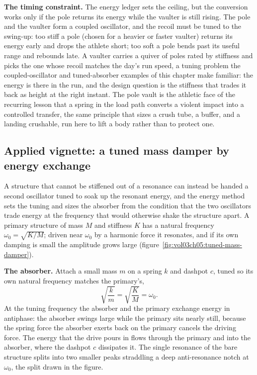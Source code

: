 \textbf{The timing constraint.} The energy ledger sets the ceiling, but the
conversion works only if the pole returns its energy while the vaulter is
still rising. The pole and the vaulter form a coupled oscillator, and the
recoil must be tuned to the swing-up: too stiff a pole (chosen for a heavier
or faster vaulter) returns its energy early and drops the athlete short; too
soft a pole bends past its useful range and rebounds late. A vaulter carries
a quiver of poles rated by stiffness and picks the one whose recoil matches
the day's run speed, a tuning problem the coupled-oscillator and
tuned-absorber examples of this chapter make familiar: the energy is there in
the run, and the design question is the stiffness that trades it back as
height at the right instant. The pole vault is the athletic face of the
recurring lesson that a spring in the load path converts a violent impact
into a controlled transfer, the same principle that sizes a crush tube, a
buffer, and a landing crushable, run here to lift a body rather than to
protect one.

\subsection{Applied vignette: a tuned mass damper by energy exchange}

A structure that cannot be stiffened out of a resonance can instead be handed
a second oscillator tuned to soak up the resonant energy, and the energy
method sets the tuning and sizes the absorber from the condition that the two
oscillators trade energy at the frequency that would otherwise shake the
structure apart. A primary structure of mass $M$ and stiffness $K$ has a
natural frequency $\omega_0 = \sqrt{K/M}$; driven near $\omega_0$ by a
harmonic force it resonates, and if its own damping is small the amplitude
grows large (figure~\ref{fig:vol03ch05:tuned-mass-damper}).



\textbf{The absorber.} Attach a small mass $m$ on a spring $k$ and dashpot $c$,
tuned so its own natural frequency matches the primary's,
\[
\sqrt{\frac{k}{m}} = \sqrt{\frac{K}{M}} = \omega_0.
\]
At the tuning frequency the absorber and the primary exchange energy in
antiphase: the absorber swings large while the primary sits nearly still,
because the spring force the absorber exerts back on the primary cancels the
driving force. The energy that the drive pours in flows through the primary and
into the absorber, where the dashpot $c$ dissipates it. The single resonance of
the bare structure splits into two smaller peaks straddling a deep
anti-resonance notch at $\omega_0$, the split drawn in the figure.

